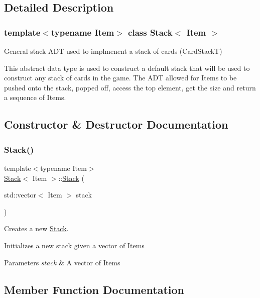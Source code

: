 \subsection{Detailed Description}
\subsubsection*{template$<$typename Item$>$\newline
class Stack$<$ Item $>$}

General stack A\+DT used to implmenent a stack of cards (Card\+StackT) 

This abstract data type is used to construct a default stack that will be used to construct any stack of cards in the game. The A\+DT allowed for Items to be pushed onto the stack, popped off, access the top element, get the size and return a sequence of Items. 

\subsection{Constructor \& Destructor Documentation}
\mbox{\label{class_stack_a083c179125f1254a5bdcd419406f108d}} 
\subsubsection{\texorpdfstring{Stack()}{Stack()}}
{\footnotesize\ttfamily template$<$typename Item$>$ \\
\hyperlink{class_stack}{Stack}$<$ Item $>$\+::\hyperlink{class_stack}{Stack} (\begin{DoxyParamCaption}\item[{std\+::vector$<$ Item $>$}]{stack }\end{DoxyParamCaption})}



Creates a new \hyperlink{class_stack}{Stack}. 

Initializes a new stack given a vector of Items 
\begin{DoxyParams}{Parameters}
{\em stack} & A vector of Items \\
\hline
\end{DoxyParams}


\subsection{Member Function Documentation}
\mbox{\label{class_stack_abd1f79b5fc7fe4b04929987b54955b67}} 
